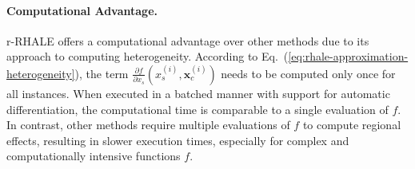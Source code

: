 \documentclass[sigconf, nonacm]{acmart}
\newcommand{\xci}{\mathbf{x}^{(i)}_c}
\begin{document}
\paragraph{Computational Advantage.}

r-RHALE offers a computational advantage over other methods due to its approach to computing heterogeneity. According to Eq.~(\ref{eq:rhale-approximation-heterogeneity}), the term \( \frac{\partial f}{\partial x_s} (x_s^{(i)}, \xci) \) needs to be computed only once for all instances. When executed in a batched manner with support for automatic differentiation, the computational time is comparable to a single evaluation of \( f \). In contrast, other methods require multiple evaluations of \( f \) to compute regional effects, resulting in slower execution times, especially for complex and computationally intensive functions \( f \).
\end{document}
